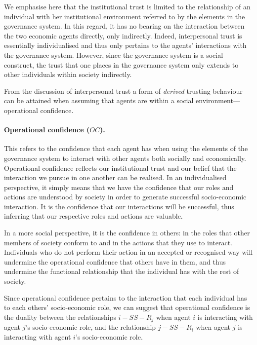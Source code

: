 \begin{subappendices}
We emphasise here that the institutional trust is limited to the relationship of an individual with her institutional environment referred to by the elements in the governance system. In this regard, it has no bearing on the interaction between the two economic agents directly, only indirectly. Indeed, interpersonal trust is essentially individualised and thus only pertains to the agents' interactions with the governance system. However, since the governance system is a social construct, the trust that one places in the governance system only extends to other individuals within society indirectly.

From the discussion of interpersonal trust a form of \textit{derived} trusting behaviour can be attained when assuming that agents are within a social environment---operational confidence.

\paragraph{Operational confidence ($OC$).}

This refers to the confidence that each agent has when using the elements of the governance system to interact with other agents both socially and economically. Operational confidence reflects our institutional trust and our belief that the interaction we pursue in one another can be realised. In an individualised perspective, it simply means that we have the confidence that our roles and actions are understood by society in order to generate successful socio-economic interaction. It is the confidence that our interactions will be successful, thus inferring that our respective roles and actions are valuable.

In a more social perspective, it is the confidence in others: in the roles that other members of society conform to and in the actions that they use to interact. Individuals who do not perform their action in an accepted or recognised way will undermine the operational confidence that others have in them, and thus undermine the functional relationship that the individual has with the rest of society.

Since operational confidence pertains to the interaction that each individual has to each others' socio-economic role, we can suggest that operational confidence is the duality between the relationships $i-SS-R_{j}$ when agent $i$ is interacting with agent $j$'s socio-economic role, and the relationship $j-SS-R_{i}$ when agent $j$ is interacting with agent $i$'s socio-economic role.


\end{subappendices}
